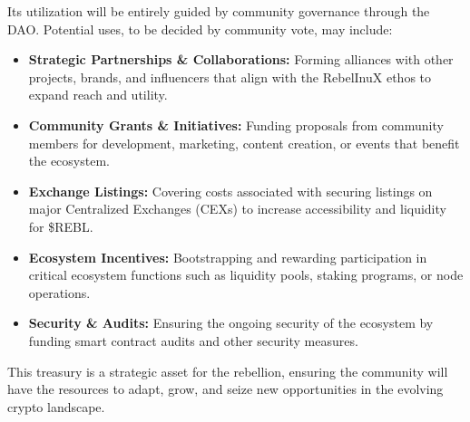 \documentclass{article}
\begin{document}
\begin{tcolorbox}[colback=headerColor!10!white, colframe=headerColor, boxrule=2pt, width=\textwidth, arc=6mm, left=8mm, right=8mm, top=6mm, bottom=6mm]
Its utilization will be entirely guided by community governance through the DAO. Potential uses, to be decided by community vote, may include:

\begin{itemize}
  \item \textbf{Strategic Partnerships \& Collaborations:} Forming alliances with other projects, brands, and influencers that align with the RebelInuX ethos to expand reach and utility.
  \item \textbf{Community Grants \& Initiatives:} Funding proposals from community members for development, marketing, content creation, or events that benefit the ecosystem.
  \item \textbf{Exchange Listings:} Covering costs associated with securing listings on major Centralized Exchanges (CEXs) to increase accessibility and liquidity for \$REBL.
  \item \textbf{Ecosystem Incentives:} Bootstrapping and rewarding participation in critical ecosystem functions such as liquidity pools, staking programs, or node operations.
  \item \textbf{Security \& Audits:} Ensuring the ongoing security of the ecosystem by funding smart contract audits and other security measures.
\end{itemize}

This treasury is a strategic asset for the rebellion, ensuring the community will have the resources to adapt, grow, and seize new opportunities in the evolving crypto landscape.

\end{tcolorbox}
\end{document}
